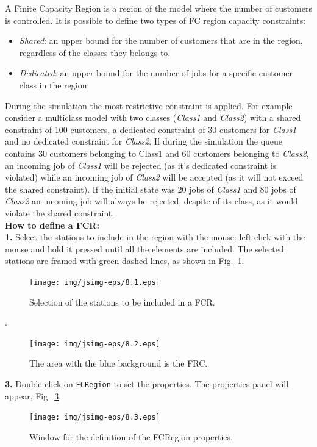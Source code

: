 A Finite Capacity Region is a region of the model where the number
of customers is controlled. It is possible to define two types of
FC region capacity constraints:
\begin{itemize}
\item \emph{Shared}: an upper bound for the number of customers
that are in the region, regardless of the classes they belongs to.
\item \emph{Dedicated}: an upper bound for the number of jobs for
a specific customer class in the region
\end{itemize}
During the simulation the most restrictive constraint is applied.
For example consider a multiclass model with two classes
(\emph{Class1} and \emph{Class2}) with a shared constraint of 100
customers, a dedicated constraint of 30 customers for
\emph{Class1} and no dedicated constraint for \emph{Class2}. If
during the simulation the queue contains 30 customers belonging to
Class1 and 60 customers belonging to \emph{Class2}, an incoming
job of \emph{Class1} will be rejected (as it's dedicated
constraint is violated) while an incoming job of \emph{Class2}
will be accepted (as it will not exceed the shared constraint). If
the initial state was 20 jobs of \emph{Class1} and 80 jobs of
\emph{Class2} an incoming job will always be rejected, despite of
its class, as it would violate the shared constraint.\\

\textbf{How to define a FCR:}\\
\textbf{ 1.}  Select the stations to include in the region with
the mouse: left-click with the mouse and hold it pressed until all
the elements are included. The selected stations are framed with
green dashed lines, as shown in Fig.~\ref{fig:selsatfcr}.\\
\begin{figure}[h]
    \begin{center}
        \texttt{[image: img/jsimg-eps/8.1.eps]}
    \end{center}
    \caption{Selection of the stations to be included in a FCR.}
    \label{fig:selsatfcr}
\end{figure}
.\\
\begin{figure}[h]
    \begin{center}
        \texttt{[image: img/jsimg-eps/8.2.eps]}
    \end{center}
    \caption{The area with the blue background is the FRC.}
    \label{fig:selfcrblueback}
\end{figure}
\textbf{3.}  Double click on \texttt{FCRegion} to set the
properties. The properties panel will appear,
Fig.~\ref{fig:fcrdefprop}.
\begin{figure}[h!]
    \begin{center}
        \texttt{[image: img/jsimg-eps/8.3.eps]}
    \end{center}
    \caption{Window for the definition of the FCRegion properties.}
    \label{fig:fcrdefprop}
\end{figure}

